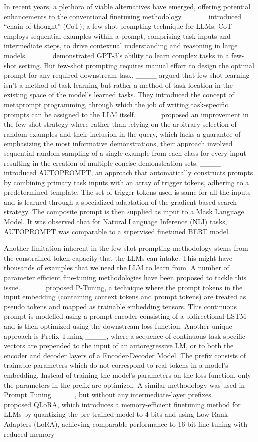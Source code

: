In recent years, a plethora of viable alternatives have emerged, offering potential enhancements to the conventional finetuning methodology.
____ introduced ``chain-of-thought'' (CoT), a few-shot prompting technique for LLMs. CoT employs sequential examples within a prompt, comprising task inputs and intermediate steps, to drive contextual understanding and reasoning in large models. ____ demonstrated GPT-3's ability to learn complex tasks in a few-shot setting.
But few-shot prompting requires manual effort to design the optimal prompt for any required downstream task. ____ argued that few-shot learning isn't a method of task learning but rather a method of task location in the existing space of the model's learned tasks. They introduced the concept of metaprompt programming, through which the job of writing task-specific prompts can be assigned to the LLM itself. ____ proposed an improvement in the few-shot strategy where rather than relying on the arbitrary selection of random examples and their inclusion in the query, which lacks a guarantee of emphasizing the most informative demonstrations, their approach involved sequential random sampling of a single example from each class for every input resulting in the creation of multiple concise demonstration sets. ____ introduced AUTOPROMPT, an approach that automatically constructs prompts by combining primary task inputs with an array of trigger tokens, adhering to a predetermined template. The set of trigger tokens used is same for all the inputs and is learned through a specialized adaptation of the gradient-based search strategy. The composite prompt is then supplied as input to a Mask Language Model. It was observed that for Natural Language Inference (NLI) tasks, AUTOPROMPT was comparable to a supervised finetuned BERT model.

Another limitation inherent in the few-shot prompting methodology stems from the constrained token capacity that the LLMs can intake. This might have thousands of examples that we need the LLM to learn from. A number of parameter efficient fine-tuning methodologies have been proposed to tackle this issue. 
____ proposed P-Tuning, a technique where the prompt tokens in the input embedding (containing context tokens and prompt tokens) are treated as pseudo tokens and mapped as trainable embedding tensors. This continuous prompt is modelled using a prompt encoder consisting of a bidirectional LSTM and is then optimized using the downstream loss function. Another unique approach is Prefix Tuning ____, where a sequence of continuous task-specific vectors are prepended to the input of an autoregressive LM, or to both the encoder and decoder layers of a Encoder-Decoder Model. The prefix consists of trainable parameters which do not correspond to real tokens in a model's embedding. Instead of training the model's parameters on the loss function, only the parameters in the prefix are optimized. A similar methodology was used in Prompt Tuning ____, but without any intermediate-layer prefixes. ____ proposed QLoRA, which introduces a memory-efficient finetuning method for LLMs by quantizing the pre-trained model to 4-bits and using Low Rank Adapters (LoRA), achieving comparable performance to 16-bit fine-tuning with reduced memory

